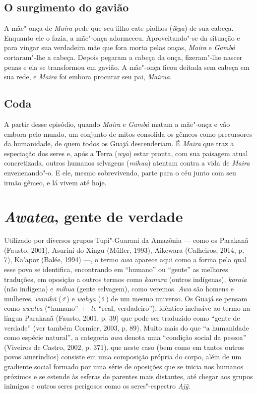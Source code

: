 \subsection{O surgimento do gavião}

\forceindent A mãe"-onça de \emph{Maira} pede que seu filho cate piolhos (\emph{ikya})
de sua cabeça. Enquanto ele o fazia, a mãe"-onça adormeceu.
Aproveitando"-se da situação e para vingar sua verdadeira mãe que fora
morta pelas onças, \emph{Maira} e \emph{Gambá} cortaram"-lhe a cabeça.
Depois pegaram a cabeça da onça, fizeram"-lhe nascer penas e ela se
transformou em gavião. A mãe"-onça ficou deitada sem cabeça em sua rede,
e \emph{Maira} foi embora procurar seu pai, \emph{Mairua}.

\subsection{Coda}

A partir desse episódio, quando \emph{Maira} e \emph{Gambá} matam a
mãe"-onça e vão embora pelo mundo, um conjunto de mitos consolida os
gêmeos como precursores da humanidade, de quem todos os Guajá
descenderiam. É \emph{Maira} que traz a especiação dos seres e, após a
Terra (\emph{wya}) estar pronta, com sua paisagem atual concretizada,
outros humanos selvagens (\emph{mihua}) atentam contra a vida de
\emph{Maira} envenenando"-o. E ele, mesmo sobrevivendo, parte para o céu
junto com seu irmão gêmeo, e lá vivem até hoje.

\section{\emph{Awatea}, gente de verdade}\label{awatea-gente-de-verdade}

Utilizado por diversos grupos Tupi"-Guarani da Amazônia --- como os
Parakanã (Fausto, 2001), Asuriní do Xingu (Müller, 1993), Aikewara
(Calheiros, 2014, p. 7), Ka'apor (Balée, 1994) ---, o termo \emph{awa}
aparece aqui como a forma pela qual esse povo se identifica, encontrando
em ``humano'' ou ``gente'' as melhores traduções, em oposição a outros
termos como \emph{kamara} (outros indígenas), \emph{karaia} (não
indígena) e \emph{mihua} (gente selvagem), como veremos. \emph{Awa} são
homens e mulheres, \emph{wanihã} (♂) e \emph{wahya} (♀) de um
mesmo universo. Os Guajá se pensam como \emph{awatea} (``humano'' +
\emph{-te} ``real, verdadeiro''), idêntico inclusive ao termo na língua
Parakanã (Fausto, 2001, p. 39) que pode ser traduzido como ``gente de
verdade'' (ver também Cormier, 2003, p. 89). Muito mais do que ``a
humanidade como espécie natural'', a categoria \emph{awa} denota uma
``condição social da pessoa'' (Viveiros de Castro, 2002, p. 371), que
neste caso (bem como em tantos outros povos ameríndios) consiste em uma
composição própria do corpo, além de um gradiente social formado por uma
série de oposições que se inicia nos humanos próximos e se estende às
esferas de parentes mais distantes, até chegar aos grupos inimigos e
outros seres perigosos como os seres"-espectro \emph{Ajỹ}.

